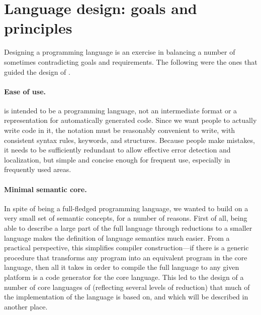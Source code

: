 \section{Language design: goals and principles}

Designing a programming language is an
exercise in balancing a number of sometimes contradicting goals and
requirements. The following were the ones that guided the design of
\Cal.

\paragraph{Ease of use.} \Cal is intended to be a programming
language, not an intermediate format or a representation for
automatically generated code. Since we want people to actually write
code in it, the notation must be reasonably convenient to write, with
consistent syntax rules, keywords, and structures. Because people make
mistakes, it needs to be sufficiently redundant to allow effective error
detection and localization, but simple and concise enough for frequent
use, especially in frequently used areas.

\paragraph{Minimal semantic core.} In spite of being a full-fledged
programming language, we wanted to build \Cal on a very small set of
semantic concepts, for a number of reasons. First of all, being able
to describe a large part of the full language through reductions to a
smaller language makes the definition of language semantics much
easier. From a practical perspective, this simplifies compiler
construction---if there is a generic procedure that transforms any
program into an equivalent program in the core language, then all it
takes in order to compile the full language to any given platform is a
code generator for the core language. This led to the design of a
number of core languages of \Cal (reflecting several levels of
reduction) that much of the implementation of the language is based
on, and which will be described in another place.

